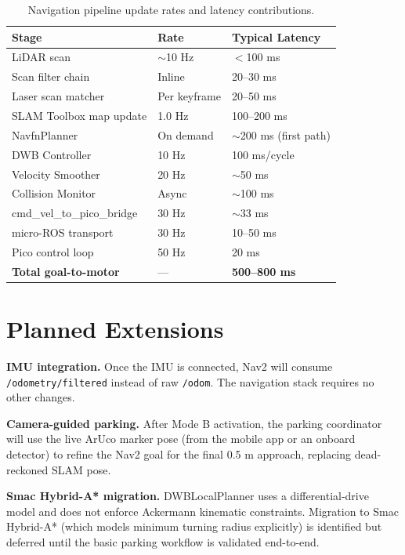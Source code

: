 \documentclass[12pt,a4paper]{report}
\begin{document}
\begin{table}[H]
\centering
\caption{Navigation pipeline update rates and latency contributions.}
\label{tab:latency}
\begin{tabularx}{\textwidth}{|p{4.5cm}|p{2cm}|X|}
\hline
\textbf{Stage} & \textbf{Rate} & \textbf{Typical Latency} \\
\hline
LiDAR scan & $\sim$10 Hz & $<$100 ms \\
\hline
Scan filter chain & Inline & 20--30 ms \\
\hline
Laser scan matcher & Per keyframe & 20--50 ms \\
\hline
SLAM Toolbox map update & 1.0 Hz & 100--200 ms \\
\hline
NavfnPlanner & On demand & $\sim$200 ms (first path) \\
\hline
DWB Controller & 10 Hz & 100 ms/cycle \\
\hline
Velocity Smoother & 20 Hz & $\sim$50 ms \\
\hline
Collision Monitor & Async & $\sim$100 ms \\
\hline
cmd\_vel\_to\_pico\_bridge & 30 Hz & $\sim$33 ms \\
\hline
micro-ROS transport & 30 Hz & 10--50 ms \\
\hline
Pico control loop & 50 Hz & 20 ms \\
\hline
\textbf{Total goal-to-motor} & --- & \textbf{500--800 ms} \\
\hline
\end{tabularx}
\end{table}

\section{Planned Extensions}

\textbf{IMU integration.} Once the IMU is connected, Nav2 will consume \texttt{/odometry/filtered} instead of raw \texttt{/odom}. The navigation stack requires no other changes.

\textbf{Camera-guided parking.} After Mode B activation, the parking coordinator will use the live ArUco marker pose (from the mobile app or an onboard detector) to refine the Nav2 goal for the final 0.5 m approach, replacing dead-reckoned SLAM pose.

\textbf{Smac Hybrid-A* migration.} DWBLocalPlanner uses a differential-drive model and does not enforce Ackermann kinematic constraints. Migration to Smac Hybrid-A* (which models minimum turning radius explicitly) is identified but deferred until the basic parking workflow is validated end-to-end.
\end{document}
